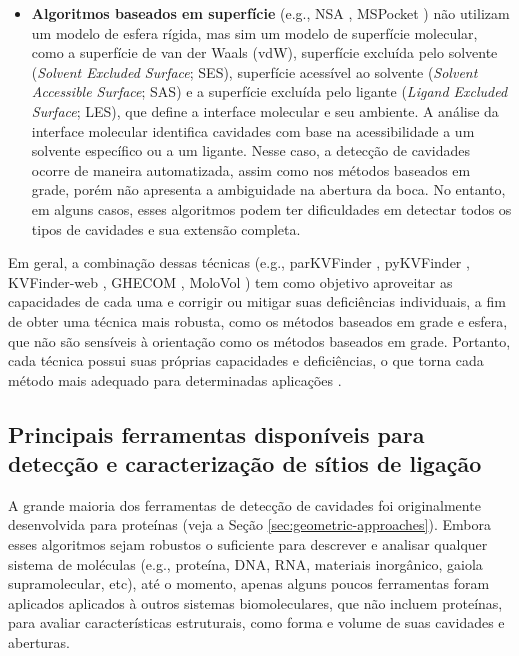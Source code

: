 \documentclass[Portugues]{phdquali}
\def\eg{e.g.\onedot}
\begin{document}
\begin{itemize}
  \item \textbf{Algoritmos baseados em superfície} (\eg, NSA \cite{nsa}, MSPocket \cite{mspocket}) não utilizam um modelo de esfera rígida, mas sim um modelo de superfície molecular, como a superfície de van der Waals (vdW), superfície excluída pelo solvente (\textit{Solvent Excluded Surface}; SES), superfície acessível ao solvente (\textit{Solvent Accessible Surface}; SAS) e a superfície excluída pelo ligante (\textit{Ligand Excluded Surface}; LES), que define a interface molecular e seu ambiente. A análise da interface molecular identifica cavidades com base na acessibilidade a um solvente específico ou a um ligante. Nesse caso, a detecção de cavidades ocorre de maneira automatizada, assim como nos métodos baseados em grade, porém não apresenta a ambiguidade na abertura da boca. No entanto, em alguns casos, esses algoritmos podem ter dificuldades em detectar todos os tipos de cavidades e sua extensão completa.
\end{itemize}

Em geral, a combinação dessas técnicas (\eg, parKVFinder \cite{guerra2020}, pyKVFinder \cite{guerra2021}, KVFinder-web \cite{guerra2023B}, GHECOM \cite{ghecom}, MoloVol \cite{molovol}) tem como objetivo aproveitar as capacidades de cada uma e corrigir ou mitigar suas deficiências individuais, a fim de obter uma técnica mais robusta, como os métodos baseados em grade e esfera, que não são sensíveis à orientação como os métodos baseados em grade. Portanto, cada técnica possui suas próprias capacidades e deficiências, o que torna cada método mais adequado para determinadas aplicações \cite{simoes2017,krone2016}.

\subsection{Principais ferramentas disponíveis para detecção e caracterização de sítios de ligação}

A grande maioria dos ferramentas de detecção de cavidades foi originalmente desenvolvida para proteínas (veja a Seção \ref{sec:geometric-approaches}). Embora esses algoritmos sejam robustos o suficiente para descrever e analisar qualquer sistema de moléculas (\eg, proteína, DNA, RNA, materiais inorgânico, gaiola supramolecular, etc), até o momento, apenas alguns poucos ferramentas foram aplicados aplicados à outros sistemas biomoleculares, que não incluem proteínas, para avaliar características estruturais, como forma e volume de suas cavidades e aberturas. 
\end{document}

